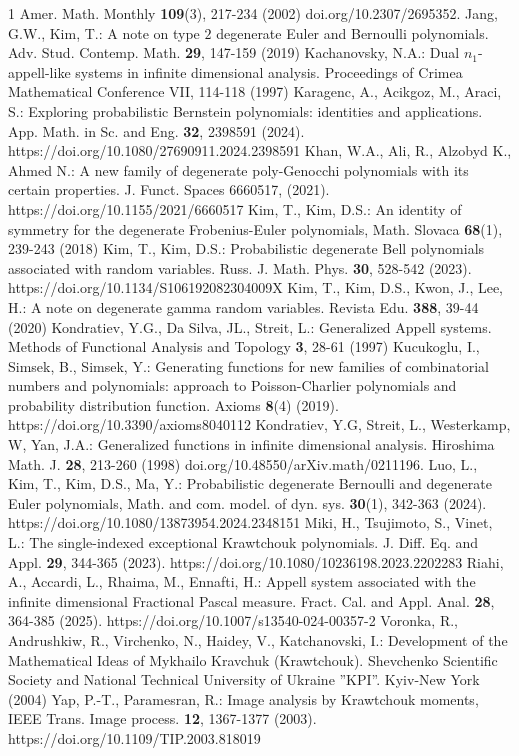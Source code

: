 \documentclass{birkjour}
\theoremstyle{definition}
\theoremstyle{remark}
\numberwithin{equation}{section}
\begin{document}
\begin{thebibliography}{1}
Amer. Math. Monthly \textbf{109}(3), 217-234 (2002)
doi.org/10.2307/2695352.
\bibitem{[jk19]}
Jang, G.W., Kim, T.: A note on type $2$ degenerate Euler and
Bernoulli polynomials. Adv. Stud. Contemp. Math. \textbf{29},
147-159 (2019)
\bibitem{[k97]}
Kachanovsky, N.A.: Dual $n_{1}$-appell-like systems in infinite
dimensional analysis. Proceedings of Crimea Mathematical Conference
VII, 114-118 (1997)
%
\bibitem{[kaa24]}
Karagenc, A., Acikgoz, M., Araci, S.: Exploring probabilistic
Bernstein polynomials: identities and applications. App. Math. in
Sc. and Eng. \textbf{32}, 2398591 (2024).
https://doi.org/10.1080/27690911.2024.2398591
\bibitem{[kaaa21]}
Khan, W.A., Ali, R., Alzobyd K., Ahmed N.: A new family of
degenerate poly-Genocchi polynomials with its certain properties. J.
Funct. Spaces 6660517, (2021). https://doi.org/10.1155/2021/6660517
\bibitem{[kk18]}
Kim, T., Kim, D.S.: An identity of symmetry for the degenerate
Frobenius-Euler polynomials, Math. Slovaca \textbf{68}(1), 239-243
(2018)
\bibitem{[kk23]}
Kim, T., Kim, D.S.: Probabilistic degenerate Bell polynomials
associated with random variables. Russ. J. Math. Phys. \textbf{30},
528-542 (2023). https://doi.org/10.1134/S106192082304009X
\bibitem{[kkkl20]}
Kim, T., Kim, D.S., Kwon, J.,  Lee, H.: A note on degenerate gamma
random variables. Revista Edu. \textbf{388}, 39-44 (2020)
\bibitem{[kss97]}
Kondratiev, Y.G., Da Silva, JL., Streit, L.: Generalized Appell
systems. Methods of Functional Analysis and Topology \textbf{3},
28-61 (1997)
\bibitem{[kss19]}
Kucukoglu, I., Simsek, B., Simsek, Y.: Generating functions for new
families of combinatorial numbers and polynomials: approach to
Poisson-Charlier polynomials and probability distribution function.
Axioms \textbf{8}(4) (2019). https://doi.org/10.3390/axioms8040112
\bibitem{[kswy98]}
Kondratiev, Y.G, Streit, L., Westerkamp, W, Yan, J.A.: Generalized
functions in infinite dimensional analysis. Hiroshima Math. J.
\textbf{28}, 213-260 (1998) doi.org/10.48550/arXiv.math/0211196.
\bibitem{[ltdy24]}
Luo, L., Kim, T., Kim, D.S., Ma, Y.: Probabilistic degenerate
Bernoulli and degenerate Euler polynomials, Math. and com. model. of
dyn. sys. \textbf{30}(1), 342-363 (2024).
https://doi.org/10.1080/13873954.2024.2348151
\bibitem{[mtv23]}
Miki, H., Tsujimoto, S., Vinet, L.: The single-indexed exceptional
Krawtchouk polynomials. J. Diff. Eq. and Appl. \textbf{29}, 344-365
(2023). https://doi.org/10.1080/10236198.2023.2202283
\bibitem{[rare25]}
Riahi, A., Accardi, L., Rhaima, M., Ennafti, H.: Appell system
associated with the infinite dimensional Fractional Pascal measure.
Fract. Cal. and Appl. Anal. \textbf{28}, 364-385 (2025).
https://doi.org/10.1007/s13540-024-00357-2
\bibitem{[vk04]}
Voronka, R., Andrushkiw, R., Virchenko, N., Haidey, V.,
Katchanovski, I.: Development of the Mathematical Ideas of Mykhailo
Kravchuk (Krawtchouk). Shevchenko Scientific Society and National
Technical University of Ukraine ''KPI''. Kyiv-New York (2004)
\bibitem{[yp03]}
Yap, P.-T., Paramesran, R.: Image analysis by Krawtchouk moments,
IEEE Trans. Image process. \textbf{12}, 1367-1377 (2003).
https://doi.org/10.1109/TIP.2003.818019
%
\end{thebibliography}
\end{document}
